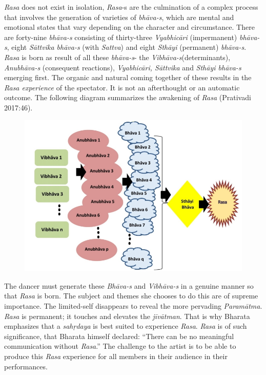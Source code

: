 \textit{Rasa} does not exist in isolation, \textit{Rasa}-s are the culmination of a complex process that involves the generation of varieties of \textit{bhāva-s}, which are mental and emotional states that vary depending on the character and circumstance. There are forty-nine \textit{bhāva-s }consisting of thirty-three \textit{Vyabhicāri} (impermanent) \textit{bhāva-s}, eight \textit{Sāttvika bhāva-s} (with \textit{Sattva}) and eight \textit{Sthāyi} (permanent) \textit{bhāva-s}. \textit{Rasa} is born as result of all these \textit{bhāva-s}- the \textit{Vibhāva-s}(determinants), \textit{Anubhāva-s} (consequent reactions), \textit{Vyabhicāri, Sāttvika} and \textit{Sthāyi bhāva-s }emerging first. The organic and natural coming together of these results in the \textit{Rasa experience }of the spectator. It is not an afterthought or an automatic outcome. The following diagram summarizes the awakening of \textit{Rasa} (Prativadi 2017:46).

\begin{figure}[!htbp]
\includegraphics[scale=1.21]{images/11-01.jpg}
\end{figure}

The dancer must generate these \textit{Bhāva-s} and \textit{Vibhāva-s} in a genuine manner so that \textit{Rasa} is born. The subject and themes she chooses to do this are of supreme importance. The limited-self disappears to reveal the more pervading \textit{Paramātma}. \textit{Rasa} is permanent; it touches and elevates the \textit{jīvātman}. That is why Bharata emphasizes that a \textit{sahṛdaya} is best suited to experience \textit{Rasa}. \textit{Rasa} is of such significance, that Bharata himself declared: “There can be no meaningful communication without \textit{Rasa}.” The challenge to the artist is to be able to produce this \textit{Rasa} experience for all members in their audience in their performances.

